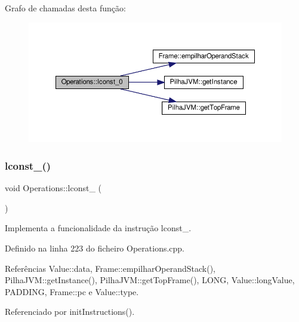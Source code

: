 Grafo de chamadas desta função\+:\nopagebreak
\begin{figure}[H]
\begin{center}
\leavevmode
\includegraphics[width=350pt]{classOperations_a89586a819a6e67c2168d7d6e43f087ef_cgraph}
\end{center}
\end{figure}
\mbox{\label{classOperations_ae6c6a8e3d75dec712e534434f85909ce}} 
\subsubsection{\texorpdfstring{lconst\+\_()}{lconst\_1()}}
{\footnotesize\ttfamily void Operations\+::lconst\+\_ (\begin{DoxyParamCaption}{ }\end{DoxyParamCaption})\hspace{0.3cm}{\ttfamily [private]}}



Implementa a funcionalidade da instrução lconst\+\_. 



Definido na linha 223 do ficheiro Operations.\+cpp.



Referências Value\+::data, Frame\+::empilhar\+Operand\+Stack(), Pilha\+J\+V\+M\+::get\+Instance(), Pilha\+J\+V\+M\+::get\+Top\+Frame(), L\+O\+NG, Value\+::long\+Value, P\+A\+D\+D\+I\+NG, Frame\+::pc e Value\+::type.



Referenciado por init\+Instructions().

